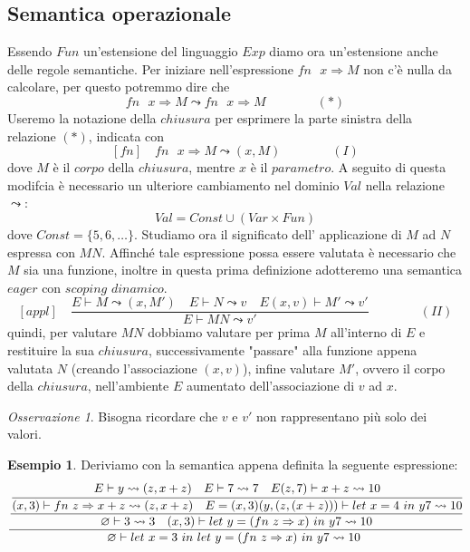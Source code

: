 \documentclass{article}
\theoremstyle{definition}
\theoremstyle{definition}
\theoremstyle{definition}
\newtheorem{example}[theorem]{Esempio}
\theoremstyle{remark}
\newtheorem{remark}[theorem]{Osservazione}
\begin{document}
    \subsection{Semantica operazionale}
    Essendo $Fun$ un'estensione del linguaggio  $Exp$ diamo ora un'estensione anche delle regole semantiche. Per iniziare nell'espressione
$\text{$fn$ $x\Rightarrow M$}$  non c'è nulla da calcolare, per questo potremmo dire che
    $$\text{$fn$ $x\Rightarrow M$}\leadsto \text{$fn$ $x\Rightarrow M$}\qquad \qquad(*)$$
    Useremo la notazione della $chiusura$ per esprimere la parte sinistra della relazione  $(*)$, indicata con
    $$[fn]\quad\text{$fn$ $x\Rightarrow M$}\leadsto (x,M)\qquad \qquad (I)$$
    dove $M$ è il $corpo$ della $chiusura$, mentre $x$ è il $parametro$. A seguito di questa
    modifcia è necessario un ulteriore cambiamento nel dominio $Val$ nella relazione $\leadsto$:
    $$Val = Const \cup (Var\times Fun)$$
    dove $Const = \{5,6,\dots\}$.
    Studiamo ora il significato dell' applicazione di $M$ ad $N$ espressa con $MN$. Affinché tale espressione possa essere valutata è necessario
    che $M$ sia una funzione, inoltre in questa prima definizione adotteremo una semantica $eager$ con $scoping$ $dinamico$.
    $$[appl]\quad\frac{E\vdash M \leadsto (x,M') \quad E \vdash N\leadsto v \quad E(x,v)\vdash M'\leadsto v'}{E\vdash MN\leadsto v'}\qquad \qquad (II)$$
    quindi, per valutare $MN$  dobbiamo valutare per prima $M$  all'interno di $E$ e restituire la sua $chiusura$, successivamente "passare"
    alla funzione appena valutata $N$ (creando l'associazione $(x,v)$), infine valutare $M'$, ovvero il corpo della $chiusura$, nell'ambiente $E$ aumentato dell'associazione
    di $v$ ad $x$.
    \begin{remark}
        Bisogna ricordare che $v$ e $v'$ non rappresentano più solo dei valori.
    \end{remark}
    \begin{example}
        Deriviamo con la semantica appena definita la seguente espressione:
        $$\cfrac{\cfrac{\cfrac{E\vdash y\leadsto (z,x+z)\quad E\vdash 7\leadsto 7\quad E(z,7)\vdash x+z \leadsto 10}{(x,3)\vdash \text{$fn$ $z\Rightarrow x+z$}\leadsto (z,x+z)\quad E =(x,3)(y,(z,(x+z)))\vdash \text{$let$ $x=4$ $in$ $y7\leadsto 10$}}}
                {\varnothing\vdash 3\leadsto 3 \quad (x,3)\vdash\text{$let$ $y = (fn$ $z\Rightarrow x$) $in$ $y7\leadsto 10$}}}
            {\varnothing \vdash \text{$let$ $x=3$ $in$ $let$ $y = (fn$ $z\Rightarrow x$) $in$ $y7\leadsto 10$ }}$$
    \end{example}
\end{document}
